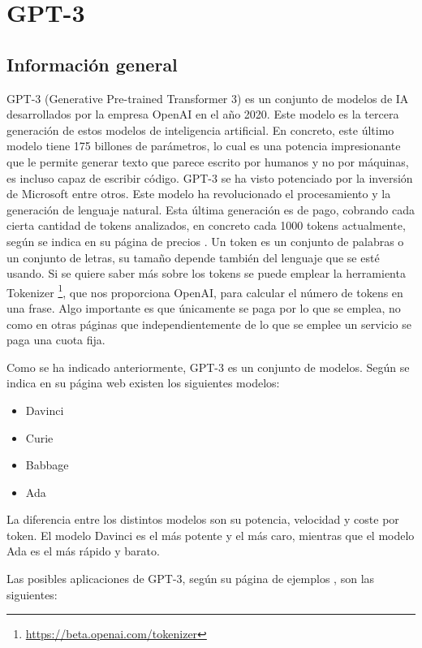 \section{GPT-3}

\subsection*{Información general}

GPT-3 (Generative Pre-trained Transformer 3) es un conjunto de modelos de \gls{IA} desarrollados por la empresa OpenAI en el año 2020. Este modelo es la tercera generación de estos modelos de inteligencia artificial. En concreto, este último modelo tiene 175 billones de parámetros, lo cual es una potencia impresionante que le permite generar texto que parece escrito por humanos y no por máquinas, es incluso capaz de escribir código. GPT-3 se ha visto potenciado por la inversión de Microsoft entre otros. Este modelo ha revolucionado el procesamiento y la generación de lenguaje natural. Esta última generación es de pago, cobrando cada cierta cantidad de tokens analizados, en concreto cada 1000 tokens actualmente, según se indica en su página de precios \cite{RefWorks:RefID:21-openai.}. Un token es un conjunto de palabras o un conjunto de letras, su tamaño depende también del lenguaje que se esté usando. Si se quiere saber más sobre los tokens se puede emplear la herramienta Tokenizer \footnote{\url{https://beta.openai.com/tokenizer}}, que nos proporciona OpenAI, para calcular el número de tokens en una frase. Algo importante es que únicamente se paga por lo que se emplea, no como en otras páginas que independientemente de lo que se emplee un servicio se paga una cuota fija.

Como se ha indicado anteriormente, GPT-3 es un conjunto de modelos. Según se indica en su página web \cite{RefWorks:RefID:22-modelos} existen los siguientes modelos:

\begin{itemize}
\item Davinci
\item Curie
\item Babbage
\item Ada
\end{itemize}

La diferencia entre los distintos modelos son su potencia, velocidad y coste por token. El modelo Davinci es el más potente y el más caro, mientras que el modelo Ada es el más rápido y barato.

Las posibles aplicaciones de GPT-3, según su página de ejemplos \cite{RefWorks:RefID:23-openai.}, son las siguientes:

